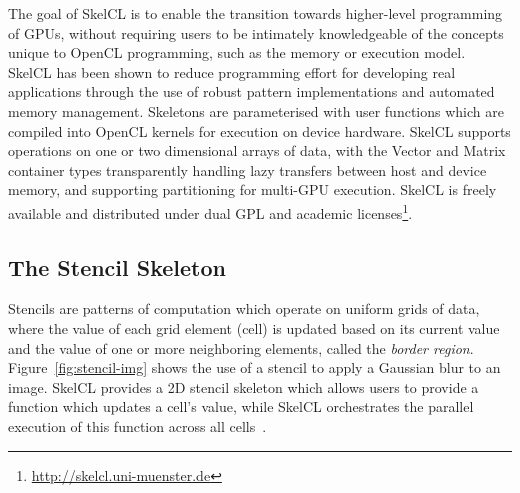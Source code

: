 \documentclass[nonatbib,preprint,nocopyrightspace,9pt]{sigplanconf}
\begin{document}
The goal of SkelCL is to enable the transition towards higher-level
programming of GPUs, without requiring users to be intimately
knowledgeable of the concepts unique to OpenCL programming, such as
the memory or execution model. SkelCL has been shown to reduce
programming effort for developing real applications through the use of
robust pattern implementations and automated memory
management. Skeletons are parameterised with user functions which are
compiled into OpenCL kernels for execution on device hardware. SkelCL
supports operations on one or two dimensional arrays of data, with the
Vector and Matrix container types transparently handling lazy
transfers between host and device memory, and supporting partitioning
for multi-GPU execution. SkelCL is freely available and distributed
under dual GPL and academic
licenses\footnote{\url{http://skelcl.uni-muenster.de}}.

\subsection{The Stencil Skeleton}

Stencils are patterns of computation which operate on uniform grids of
data, where the value of each grid element (cell) is updated based on
its current value and the value of one or more neighboring elements,
called the \emph{border region}. Figure~\ref{fig:stencil-img} shows
the use of a stencil to apply a Gaussian blur to an image. SkelCL
provides a 2D stencil skeleton which allows users to provide a
function which updates a cell's value, while SkelCL orchestrates the
parallel execution of this function across all
cells~\cite{Steuwer2014a}.
\end{document}
